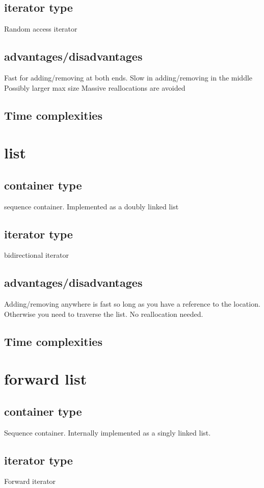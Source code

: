 \documentclass{report}
\begin{document}
    \subsection{iterator type}
    Random access iterator
    \subsection{advantages/disadvantages}
    Fast for adding/removing at both ends. Slow in adding/removing in the middle
    \bigbreak \noindent
    Possibly larger max size
    \bigbreak \noindent
    Massive reallocations are avoided
    \subsection{Time complexities}
    
    \section{list}
    \subsection{container type} 
    sequence container. Implemented as a doubly linked list
    \subsection{iterator type}
    bidirectional iterator
    \subsection{advantages/disadvantages}
    Adding/removing anywhere is fast so long as you have a reference to the location. Otherwise you need to traverse the list.
    \bigbreak \noindent
    No reallocation needed.
    \subsection{Time complexities}

    \section{forward list}
    \subsection{container type} 
    Sequence container. Internally implemented as a singly linked list.
    \subsection{iterator type}
    Forward iterator
\end{document}
